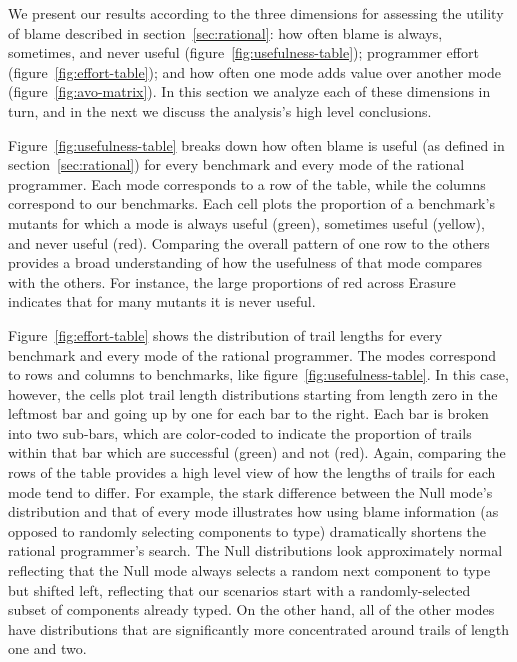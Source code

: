 We present our results according to the three dimensions for assessing the utility of blame described in section~\ref{sec:rational}: how often blame is always, sometimes, and never useful (figure~\ref{fig:usefulness-table}); programmer effort (figure~\ref{fig:effort-table}); and how often one mode adds value over another mode (figure~\ref{fig:avo-matrix}).
In this section we analyze each of these dimensions in turn, and in the next we discuss the analysis's high level conclusions.

Figure~\ref{fig:usefulness-table} breaks down how often blame is useful (as defined in section~\ref{sec:rational}) for every benchmark and every mode of the rational programmer.
Each mode corresponds to a row of the table, while the columns correspond to our benchmarks.
Each cell plots the proportion of a benchmark's mutants for which a mode is always useful (green), sometimes useful (yellow), and never useful (red).
Comparing the overall pattern of one row to the others provides a broad understanding of how the usefulness of that mode compares with the others.
For instance, the large proportions of red across Erasure indicates that for many mutants it is never useful.

Figure~\ref{fig:effort-table} shows the distribution of trail lengths for every benchmark and every mode of the rational programmer.
The modes correspond to rows and columns to benchmarks, like figure~\ref{fig:usefulness-table}.
In this case, however, the cells plot trail length distributions starting from length zero in the leftmost bar and going up by one for each bar to the right.
Each bar is broken into two sub-bars, which are color-coded to indicate the proportion of trails within that bar which are successful (green) and not (red).
Again, comparing the rows of the table provides a high level view of how the lengths of trails for each mode tend to differ.
For example, the stark difference between the Null mode's distribution and that of every mode illustrates how using blame information (as opposed to randomly selecting components to type) dramatically shortens the rational programmer's search.
The Null distributions look approximately normal \emdash reflecting that the Null mode always selects a random next component to type \emdash but shifted left, reflecting that our scenarios start with a randomly-selected subset of components already typed.
On the other hand, all of the other modes have distributions that are significantly more concentrated around trails of length one and two.

